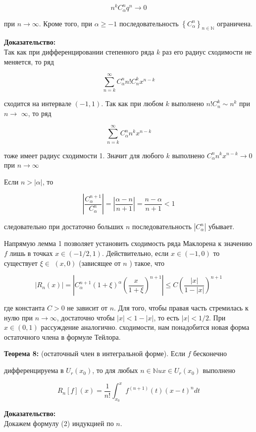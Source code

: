 \documentclass[a4paper,12pt]{article} %
\begin{document}
$$
n^{k} C_{\alpha}^{n} q^{n} \rightarrow 0
$$

при $n \rightarrow \infty$. Кроме того, при $\alpha \geq-1$ последовательность $\left\{C_{\alpha}^{n}\right\}_{n \in \mathbb{N}}$ ограничена.

\textbf{Доказательство:}\\
Так как при дифференцировании степенного ряда $k$ раз его радиус сходимости не меняется, то ряд

$$
\sum_{n=k}^{\infty} C_{\alpha}^{n} n ! C_{n}^{k} x^{n-k}
$$

сходится на интервале $(-1,1)$. Так как при любом $k$ выполнено $n ! C_{n}^{k} \sim n^{k}$ при $n \rightarrow$ $\infty$, то ряд

$$
\sum_{n=k}^{\infty} C_{\alpha}^{n} n^{k} x^{n-k}
$$

тоже имеет радиус сходимости 1. Значит для любого $k$ выполнено $C_{\alpha}^{n} n^{k} x^{n-k} \rightarrow 0$ при $n \rightarrow \infty$

Если $n>|\alpha|$, то

$$
\left|\frac{C_{\alpha}^{n+1}}{C_{\alpha}^{n}}\right|=\left|\frac{\alpha-n}{n+1}\right|=\frac{n-\alpha}{n+1}<1
$$

следовательно при достаточно больших $n$ последовательность $\left|C_{\alpha}^{n}\right|$ убывает.

Напрямую лемма 1 позволяет установить сходимость ряда Маклорена к значению $f$ лишь в точках $x \in(-1 / 2,1)$. Действительно, если $x \in(-1,0)$ то существует $\xi \in$ $(x, 0)$ (зависящее от $n$ ) такое, что

$$
\left|R_{n}(x)\right|=\left|C_{\alpha}^{n+1}(1+\xi)^{\alpha}\left(\frac{x}{1+\xi}\right)^{n+1}\right| \leq C\left(\frac{|x|}{1-|x|}\right)^{n+1}
$$

где константа $C>0$ не зависит от $n$. Для того, чтобы правая часть стремилась к нулю при $n \rightarrow \infty$, достаточно чтобы $|x|<1-|x|$, то есть $|x|<1 / 2$. При $x \in(0,1)$ рассуждение аналогично.
сходимости, нам понадобится новая форма остаточного члена в формуле Тейлора.

\textbf{Теорема 8:} (остаточный член в интегральной форме). Если $f$ бесконечно

дифференцируема в $U_{r}\left(x_{0}\right)$, то для любых $n \in \mathbb{N} u x \in U_{r}\left(x_{0}\right)$ выполнено

$$
R_{n}[f](x)=\frac{1}{n !} \int_{x_{0}}^{x} f^{(n+1)}(t)(x-t)^{n} d t
$$

\textbf{Доказательство:}\\
Докажем формулу (2) индукцией по $n$.
\end{document}
